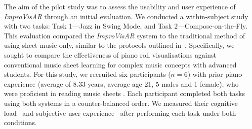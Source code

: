 \documentclass{vgtc}                          %
\begin{document}
\par %
The aim of the pilot study was to assess the usability and user experience of \textit{ImproVisAR} through an initial evaluation. We conducted a within-subject study with two tasks: Task 1—Jazz in Swing Mode, and Task 2—Compose-on-the-Fly. This evaluation compared the \textit{ImproVisAR} system to the traditional method of using sheet music only, similar to the protocols outlined in~\cite{rogers2014piano}. Specifically, we sought to compare the effectiveness of piano roll visualisations against conventional music sheet learning for complex music concepts with advanced students. For this study, we recruited six participants ($n=6$) with prior piano experience (average of 8.33 years, average age 21, 5 males and 1 female), who were proficient in reading music sheets . Each participant completed both tasks using both systems in a counter-balanced order. We measured their cognitive load~\cite{hart1988development} and subjective user experience~\cite{schrepp2017design} after performing each task under both conditions.
\end{document}
